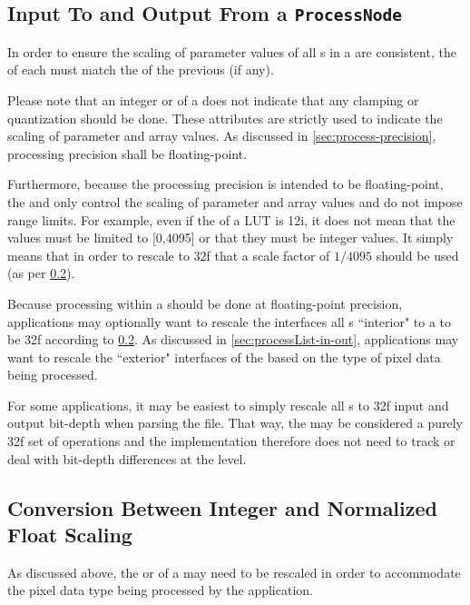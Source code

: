 \subsection{Input To and Output From a \texttt{ProcessNode}}
In order to ensure the scaling of parameter values of all s in a  are consistent, the  of each  must match the  of the previous  (if any). 

Please note that an integer  or  of a  does not indicate that any clamping or quantization should be done. These attributes are strictly used to indicate the scaling of parameter and array values. As discussed in \ref{sec:process-precision}, processing precision shall be floating-point.

Furthermore, because the processing precision is intended to be floating-point, the  and  only control the scaling of parameter and array values and do not impose range limits. For example, even if the  of a LUT  is 12i, it does not mean that the  values must be limited to [0,4095] or that they must be integer values. It simply means that in order to rescale to 32f that a scale factor of $1/4095$ should be used (as per \ref{sec:scaling}).

Because processing within a  should be done at floating-point precision, applications may optionally want to rescale the interfaces all s ``interior" to a  to be 32f according to \ref{sec:scaling}. As discussed in \ref{sec:processList-in-out}, applications may want to rescale the ``exterior" interfaces of the  based on the type of pixel data being processed.

For some applications, it may be easiest to simply rescale all s to 32f input and output bit-depth when parsing the file. That way, the  may be considered a purely 32f set of operations and the implementation therefore does not need to track or deal with bit-depth differences at the  level.


\subsection{Conversion Between Integer and Normalized Float Scaling} \label{sec:scaling}
As discussed above, the  or  of a  may need to be rescaled in order to accommodate the pixel data type being processed by the application. 

